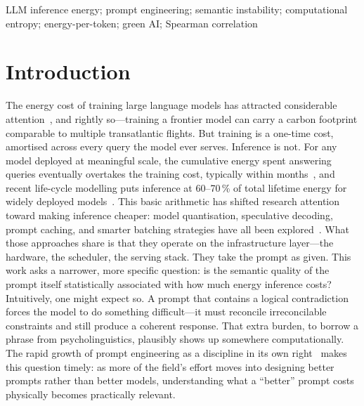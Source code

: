 \documentclass[conference]{IEEEtran}
\begin{document}
\begin{IEEEkeywords}
LLM inference energy; prompt engineering; semantic instability;
computational entropy; energy-per-token; green AI; Spearman correlation
\end{IEEEkeywords}
\section{Introduction}
The energy cost of training large language models has attracted
considerable attention~\cite{strubell2019energy,patterson2022carbon},
and rightly so---training a frontier model can carry a carbon
footprint comparable to multiple transatlantic flights. But training
is a one-time cost, amortised across every query the model ever
serves. Inference is not. For any model deployed at meaningful scale,
the cumulative energy spent answering queries eventually overtakes the
training cost, typically within months~\cite{wu2022sustainable}, and
recent life-cycle modelling puts inference at 60--70\,\% of total
lifetime energy for widely deployed models~\cite{faiz2024llmcarbon}.
This basic arithmetic has shifted research attention toward making
inference cheaper: model quantisation, speculative decoding, prompt
caching, and smarter batching strategies have all been
explored~\cite{schwartz2020green,samsi2023words,desislavov2023trends}.
What those approaches share is that they operate on the infrastructure
layer---the hardware, the scheduler, the serving stack. They take the
prompt as given. This work asks a narrower, more specific question:
is the semantic quality of the prompt itself statistically associated
with how much energy inference costs? Intuitively, one might expect
so. A prompt that contains a logical contradiction forces the model to
do something difficult---it must reconcile irreconcilable constraints
and still produce a coherent response. That extra burden, to borrow a
phrase from psycholinguistics, plausibly shows up somewhere
computationally. The rapid growth of prompt engineering as a
discipline in its own right~\cite{sahoo2024systematic} makes this
question timely: as more of the field's effort moves into designing
better prompts rather than better models, understanding what a
``better'' prompt costs physically becomes practically relevant.
\end{document}
